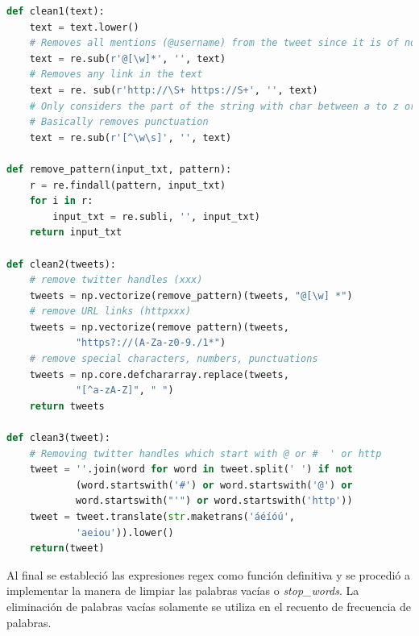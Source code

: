 \vspace{0.3cm}

\begin{lstlisting}[caption=Limpieza de las publicaciones,          label={lst:listing-python},language=Python]
def clean1(text):
    text = text.lower()
    # Removes all mentions (@username) from the tweet since it is of no use to us
    text = re.sub(r'@[\w]*', '', text)
    # Removes any link in the text
    text = re. sub(r'http://\S+ https://S+', '', text)
    # Only considers the part of the string with char between a to z or digits and whitespace characters
    # Basically removes punctuation
    text = re.sub(r'[^\w\s]', '', text)
    
def remove_pattern(input_txt, pattern):
    r = re.findall(pattern, input_txt)
    for i in r:
        input_txt = re.subli, '', input_txt)
    return input_txt
    
def clean2(tweets):
    # remove twitter handles (xxx)
    tweets = np.vectorize(remove_pattern)(tweets, "@[\w] *")
    # remove URL links (httpxxx)
    tweets = np.vectorize(remove pattern)(tweets,
            "https?://(A-Za-z0-9./1*")
    # remove special characters, numbers, punctuations
    tweets = np.core.defchararray.replace(tweets,
            "[^a-zA-Z]", " ")
    return tweets
    
def clean3(tweet):
    # Removing twitter handles which start with @ or #  ' or http
    tweet = ''.join(word for word in tweet.split(' ') if not
            (word.startswith('#') or word.startswith('@') or
            word.startswith("'") or word.startswith('http'))
    tweet = tweet.translate(str.maketrans('áéíóú',
            'aeiou')).lower()
    return(tweet)
\end{lstlisting}

Al final se estableció las expresiones regex como función definitiva y se procedió a implementar la manera de limpiar las palabras vacías o \textit{stop\_words}. La eliminación de palabras vacías solamente se utiliza en el recuento de frecuencia de palabras.

\vspace{0.3cm}

